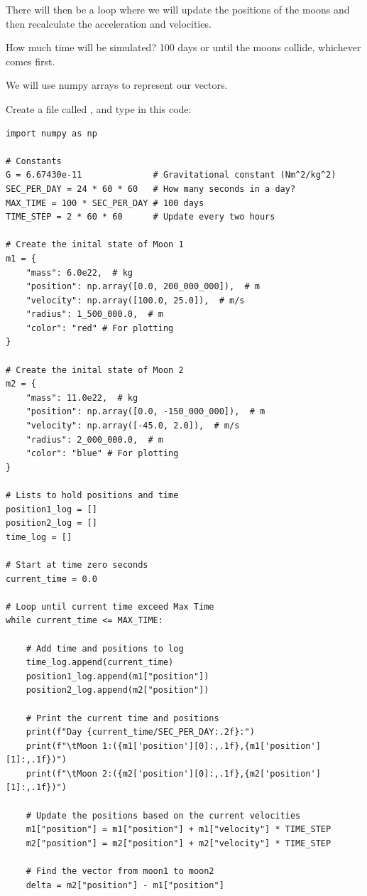 There will then be a loop where we will update the positions of the moons and then recalculate the 
acceleration and velocities.    

How much time will be simulated?  100 days or until the moons collide,  whichever
comes first.

We will use numpy arrays to represent our vectors.

Create a file called , and type in this code:

\begin{verbatim}
import numpy as np

# Constants
G = 6.67430e-11              # Gravitational constant (Nm^2/kg^2)
SEC_PER_DAY = 24 * 60 * 60   # How many seconds in a day?
MAX_TIME = 100 * SEC_PER_DAY # 100 days
TIME_STEP = 2 * 60 * 60      # Update every two hours

# Create the inital state of Moon 1
m1 = {
    "mass": 6.0e22,  # kg
    "position": np.array([0.0, 200_000_000]),  # m
    "velocity": np.array([100.0, 25.0]),  # m/s
    "radius": 1_500_000.0,  # m
    "color": "red" # For plotting
}

# Create the inital state of Moon 2
m2 = {
    "mass": 11.0e22,  # kg
    "position": np.array([0.0, -150_000_000]),  # m
    "velocity": np.array([-45.0, 2.0]),  # m/s
    "radius": 2_000_000.0,  # m
    "color": "blue" # For plotting
}  

# Lists to hold positions and time
position1_log = []
position2_log = []
time_log = []

# Start at time zero seconds
current_time = 0.0

# Loop until current time exceed Max Time
while current_time <= MAX_TIME:

    # Add time and positions to log
    time_log.append(current_time)
    position1_log.append(m1["position"])
    position2_log.append(m2["position"])
    
    # Print the current time and positions
    print(f"Day {current_time/SEC_PER_DAY:.2f}:")
    print(f"\tMoon 1:({m1['position'][0]:,.1f},{m1['position'][1]:,.1f})")
    print(f"\tMoon 2:({m2['position'][0]:,.1f},{m2['position'][1]:,.1f})")

    # Update the positions based on the current velocities
    m1["position"] = m1["position"] + m1["velocity"] * TIME_STEP
    m2["position"] = m2["position"] + m2["velocity"] * TIME_STEP

    # Find the vector from moon1 to moon2
    delta = m2["position"] - m1["position"]


\end{verbatim}
